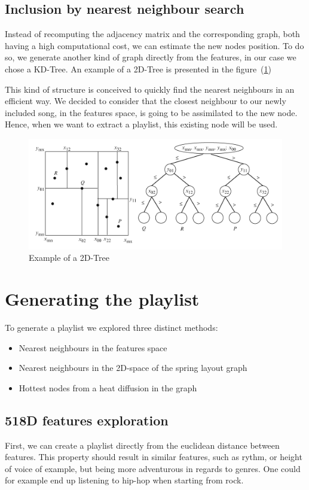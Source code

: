 \subsection{Inclusion by nearest neighbour search}
Instead of recomputing the adjacency matrix and the corresponding graph, both having a high computational cost, we can estimate the new nodes position. To do so, we generate another kind of graph directly from the features, in our case we chose a KD-Tree.
An example of a 2D-Tree is presented in the figure~(\ref{fig:ex_tree})

This kind of structure is conceived to quickly find the nearest neighbours in an efficient way.
We decided to consider that the closest neighbour to our newly included song, in the features space, is going to be assimilated to the new node. Hence, when we want to extract a playlist, this existing node will be used. %

\begin{figure}[H]
  \centering
    \includegraphics[width=\textwidth]{./Figures/tree}
  \caption{Example of a 2D-Tree}
  \label{fig:ex_tree}
\end{figure}

\section{Generating the playlist}

To generate a playlist we explored three distinct methods:
\begin{itemize}
\item Nearest neighbours in the features space
\item Nearest neighbours in the 2D-space of the spring layout graph 
\item Hottest nodes from a heat diffusion in the graph
\end{itemize}

\subsection{518D features exploration}
First, we can create a playlist directly from the euclidean distance between features. This property should result in similar features, such as rythm, or height of voice of example, but being more adventurous in regards to genres. One could for example end up listening to hip-hop when starting from rock.

